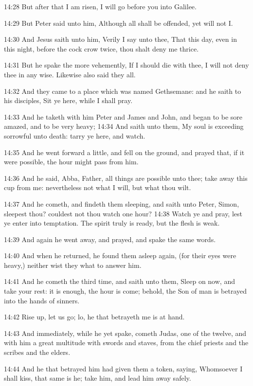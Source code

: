 14:28 But after that I am risen, I will go before you into Galilee.

14:29 But Peter said unto him, Although all shall be offended, yet
will not I.

14:30 And Jesus saith unto him, Verily I say unto thee, That this day,
even in this night, before the cock crow twice, thou shalt deny me
thrice.

14:31 But he spake the more vehemently, If I should die with thee, I
will not deny thee in any wise. Likewise also said they all.

14:32 And they came to a place which was named Gethsemane: and he
saith to his disciples, Sit ye here, while I shall pray.

14:33 And he taketh with him Peter and James and John, and began to be
sore amazed, and to be very heavy; 14:34 And saith unto them, My soul
is exceeding sorrowful unto death: tarry ye here, and watch.

14:35 And he went forward a little, and fell on the ground, and prayed
that, if it were possible, the hour might pass from him.

14:36 And he said, Abba, Father, all things are possible unto thee;
take away this cup from me: nevertheless not what I will, but what
thou wilt.

14:37 And he cometh, and findeth them sleeping, and saith unto Peter,
Simon, sleepest thou? couldest not thou watch one hour?  14:38 Watch
ye and pray, lest ye enter into temptation. The spirit truly is ready,
but the flesh is weak.

14:39 And again he went away, and prayed, and spake the same words.

14:40 And when he returned, he found them asleep again, (for their
eyes were heavy,) neither wist they what to answer him.

14:41 And he cometh the third time, and saith unto them, Sleep on now,
and take your rest: it is enough, the hour is come; behold, the Son of
man is betrayed into the hands of sinners.

14:42 Rise up, let us go; lo, he that betrayeth me is at hand.

14:43 And immediately, while he yet spake, cometh Judas, one of the
twelve, and with him a great multitude with swords and staves, from
the chief priests and the scribes and the elders.

14:44 And he that betrayed him had given them a token, saying,
Whomsoever I shall kiss, that same is he; take him, and lead him away
safely.


